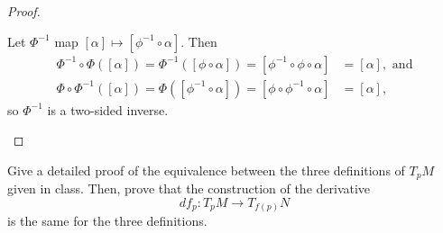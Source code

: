 \documentclass{article}
\newenvironment{problem}[2][Problem]{\begin{trivlist}
\item[\hskip \labelsep {\bfseries #1}\hskip \labelsep {\bfseries #2.}]}{\end{trivlist}}
\begin{document}
\begin{proof}
\begin{enumerate}[(a)]
\begin{enumerate}[(i)]
        Let $\Phi^{-1}$ map
        $[\alpha] \mapsto [\phi^{-1} \circ \alpha]$.
        Then \begin{align*}
          \Phi^{-1} \circ \Phi([\alpha]) = \Phi^{-1}([\phi \circ \alpha]) = [\phi^{-1} \circ \phi \circ \alpha] &= [\alpha], \text{ and}\\
          \Phi \circ \Phi^{-1}([\alpha]) = \Phi([\phi^{-1} \circ \alpha]) = [\phi \circ \phi^{-1} \circ \alpha] &= [\alpha],
        \end{align*} so $\Phi^{-1}$ is a two-sided inverse.
      \end{enumerate}
  \end{enumerate}
\end{proof}

\pagebreak

\begin{problem}{4}
  Give a detailed proof of the equivalence between the three definitions of
  $T_pM$ given in class. Then, prove that the construction of the derivative \[
    df_p\colon T_pM \rightarrow T_{f(p)}N
  \] is the same for the three definitions.
\end{problem}
\end{document}
